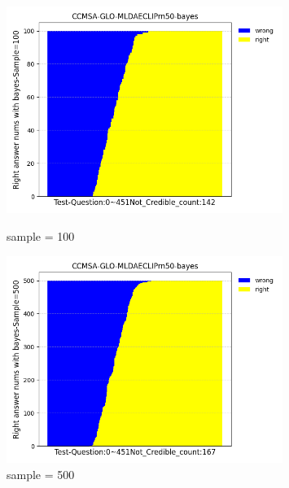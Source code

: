 \begin{figure}[htbp]
	\begin{minipage}{0.5\linewidth}
		\centering	
		\includegraphics[width=0.8\textwidth]{Fig/myfig/chapter4/sample100.png}  %
		\caption{\label{modal_bayes_sample100}sample = 100} 	
	\end{minipage}
	\begin{minipage}{0.5\linewidth}
		\centering	
		\includegraphics[width=0.8\textwidth]{Fig/myfig/chapter4/sample500.png}  %
		\caption{\label{modal_bayes_sample500}sample = 500} 	
	\end{minipage}	
\end{figure}
%
